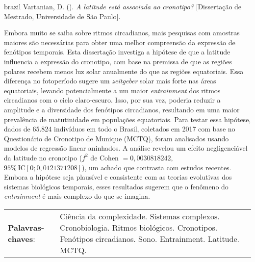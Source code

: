 
\begin{resumoenv}[\resumoestrangeironame]
\begin{otherlanguage*}{brazil}
Vartanian, D. ({\imprimirdata}). \textit{A latitude está associada ao cronotipo?} [Dissertação de Mestrado, Universidade de São Paulo].


Embora muito se saiba sobre ritmos circadianos, mais pesquisas com
amostras maiores são necessárias para obter uma melhor compreensão da
expressão de fenótipos temporais. Esta dissertação investiga a hipótese
de que a latitude influencia a expressão do cronotipo, com base na
premissa de que as regiões polares recebem menos luz solar anualmente do
que as regiões equatoriais. Essa diferença no fotoperíodo sugere um
\emph{zeitgeber} solar mais forte nas áreas equatoriais, levando
potencialmente a um maior \emph{entrainment} dos ritmos circadianos com
o ciclo claro-escuro. Isso, por sua vez, poderia reduzir a amplitude e a
diversidade dos fenótipos circadianos, resultando em uma maior
prevalência de matutinidade em populações equatoriais. Para testar essa
hipótese, dados de \(65.824\) indivíduos em todo o Brasil, coletados em
2017 com base no Questionário de Cronotipo de Munique (MCTQ), foram
analisados usando modelos de regressão linear aninhados. A análise
revelou um efeito negligenciável da latitude no cronotipo (\(f^2\) de
Cohen \(= 0,0030818242\), \(95\% \ \text{IC}[0; 0,0121371208]\)), um
achado que contrasta com estudos recentes. Embora a hipótese seja
plausível e consistente com as teorias evolutivas dos sistemas
biológicos temporais, esses resultados sugerem que o fenômeno do
\emph{entrainment} é mais complexo do que se imagina.


\begin{tabular}{p{3.6cm} p{12.3cm}}
  \textbf{Palavras-chaves}: &  Ciência da complexidade. Sistemas complexos. Cronobiologia. Ritmos biológicos. Cronotipos. Fenótipos circadianos. Sono. Entrainment. Latitude. MCTQ.
\end{tabular}
\end{otherlanguage*}
\end{resumoenv}


\tableofcontents*
\cleardoublepage


